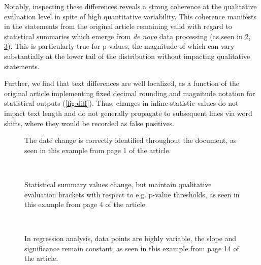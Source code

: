 Notably, inspecting these differences reveals a strong coherence at the qualitative evaluation level in spite of high quantitative variability.
This coherence manifests in the statements from the original article remaining valid with regard to statistical summaries which emerge from  \textit{de novo} data processing (as seen in \ref{fig:diff_text}, \ref{fig:diff_fig}).
This is particularly true for p-values, the magnitude of which can vary substantially at the lower tail of the distribution without impacting qualitative statements.


Further, we find that text differences are well localized, as a function of the original article implementing fixed decimal rounding and magnitude notation for statistical outputs (\cref{fig:diff}).
Thus, changes in inline statistic values do not impact text length and do not generally propagate to subsequent lines via word shifts, where they would be recorded as false positives.

\begin{figure*}
	\centering
	\begin{subfigure}{0.99\textwidth}
		\centering
		\caption{
			The date change is correctly identified throughout the document, as seen in this example from page 1 of the article.
		}
		\label{fig:diff_date}
	\end{subfigure}
	\\
	\begin{subfigure}{0.99\textwidth}
		\centering
		\caption{
			Statistical summary values change, but maintain qualitative evaluation brackets with respect to e.g. p-value thresholds, as seen in this example from page 4 of the article.
		}
		\label{fig:diff_text}
	\end{subfigure}
	\\
	\vspace{1em}
	\begin{subfigure}{0.99\textwidth}
		\centering
		\caption{
			In regression analysis, data points are highly variable, the slope and significance remain constant, as seen in this example from page 14 of the article.
		}
		\label{fig:diff_fig}
	\end{subfigure}
	\caption{
		\textbf{The article differences showcase expected quantitative and metadata variability, while maintaining overall validity of qualitative statements.}
		The figures are extracted from a full article \texttt{diff}, with tinted highlighting (blue for the Historical Manuscript Record, and orange for the new reexecution system result).
	}
	\label{fig:diff}
\end{figure*}

